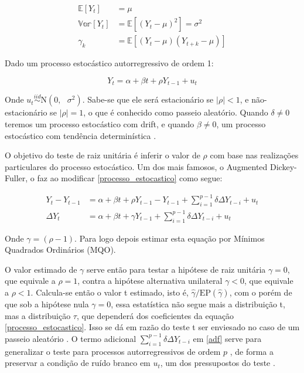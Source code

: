 \documentclass[a4paper, article, 12pt, openany, oneside, english, brazil]{abntex2}
\numberwithin{equation}{section}
\begin{document}
    \begin{align*}
        \mathbb{E}[Y_t] &= \mu \\
        \mathbb{Var}[Y_t] &= \mathbb{E}[(Y_t - \mu)^2] = \sigma^2 \\
        \gamma_k &= \mathbb{E}[(Y_t - \mu)(Y_{t+k} - \mu)]
    \end{align*}

    Dado um processo estocástico autorregressivo de ordem 1:
    
    \begin{equation}\label{processo_estocastico} Y_t = \alpha + \beta t + \rho Y_{t-1} + u_t \end{equation}
       
        Onde $ u_t \stackrel{iid}{\sim} \text{N}(0,\text{ }\sigma^2) $. Sabe-se que ele será estacionário se $ \lvert \rho \rvert < 1 $, e não-estacionário se $ \lvert \rho \rvert = 1 $, o que é conhecido como passeio aleatório. Quando $ \delta \neq 0 $ teremos um processo estocástico com drift, e quando $ \beta \neq 0 $, um processo estocástico com tendência determinística \cite[p.~40]{gustavo}.

    O objetivo do teste de raiz unitária é inferir o valor de $ \rho $ com base nas realizações particulares do processo estocástico. Um dos mais famosos, o Augmented Dickey-Fuller, o faz ao modificar \eqref{processo_estocastico} como segue:

    \begin{align}
        \label{adf}
        Y_t - Y_{t-1} &= \alpha + \beta t + \rho Y_{t-1} - Y_{t-1} + \sum_{i = 1}^{p-1}\delta \Delta Y_{t-i} + u_t \nonumber \\
        \Delta Y_t &= \alpha + \beta t + \gamma Y_{t-1} + \sum_{i = 1}^{p-1}\delta \Delta Y_{t-i} + u_t
    \end{align}

    Onde $ \gamma = (\rho - 1) $. Para logo depois estimar esta equação por Mínimos Quadrados Ordinários (MQO).
   
    O valor estimado de $ \gamma $ serve então para testar a hipótese de raiz unitária $ \gamma = 0 $, que equivale a $ \rho = 1 $, contra a hipótese alternativa unilateral $ \gamma < 0 $, que equivale a $ \rho < 1 $. Calcula-se então o valor t estimado, isto é, $ \hat{\gamma} / \text{EP}(\hat{\gamma}) $, com o porém de que sob a hipótese nula $ \gamma = 0 $, essa estatística não segue mais a distribuição t, mas a distribuição $ \tau $, que dependerá dos coeficientes da equação \eqref{processo_estocastico}. Isso se dá em razão do teste t ser enviesado no caso de um passeio aleatório \cite[p.~748-749]{gujarati}. O termo adicional $ \sum_{i = 1}^{p-1}\delta \Delta Y_{t-i} $ em \eqref{adf} serve para generalizar o teste para processos autorregressivos de ordem $ p $ \cite[p.~40]{gustavo}, de forma a preservar a condição de ruído branco em $ u_t $, um dos pressupostos do teste \cite[p.~25]{coint1}.
\end{document}

